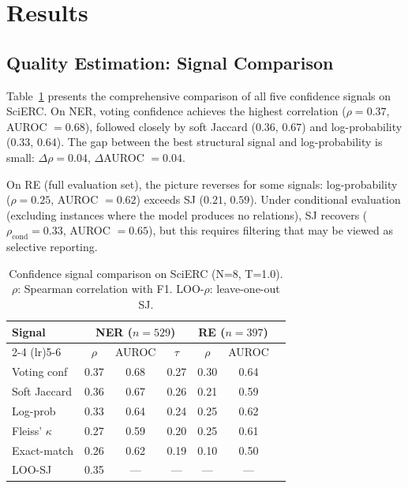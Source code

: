 \documentclass[11pt,a4paper]{article}
\begin{document}
\section{Results}
\label{sec:results}

\subsection{Quality Estimation: Signal Comparison}
\label{sec:quality}

Table~\ref{tab:signal_comparison} presents the comprehensive comparison of all five confidence signals on SciERC. On NER, voting confidence achieves the highest correlation ($\rho = 0.37$, AUROC $= 0.68$), followed closely by soft Jaccard ($0.36$, $0.67$) and log-probability ($0.33$, $0.64$). The gap between the best structural signal and log-probability is small: $\Delta\rho = 0.04$, $\Delta$AUROC $= 0.04$.

On RE (full evaluation set), the picture reverses for some signals: log-probability ($\rho = 0.25$, AUROC $= 0.62$) exceeds SJ ($0.21$, $0.59$). Under conditional evaluation (excluding instances where the model produces no relations), SJ recovers ($\rho_{\text{cond}} = 0.33$, AUROC $= 0.65$), but this requires filtering that may be viewed as selective reporting.

\begin{table}[t]
\centering
\small
\caption{Confidence signal comparison on SciERC (N=8, T=1.0). $\rho$: Spearman correlation with F1. LOO-$\rho$: leave-one-out SJ.}
\label{tab:signal_comparison}
\begin{tabular}{lcccccc}
\toprule
Signal & \multicolumn{3}{c}{NER ($n=529$)} & \multicolumn{2}{c}{RE ($n=397$)} \\
\cmidrule(lr){2-4} \cmidrule(lr){5-6}
 & $\rho$ & AUROC & $\tau$ & $\rho$ & AUROC \\
\midrule
Voting conf & 0.37 & 0.68 & 0.27 & 0.30 & 0.64 \\
Soft Jaccard & 0.36 & 0.67 & 0.26 & 0.21 & 0.59 \\
Log-prob & 0.33 & 0.64 & 0.24 & 0.25 & 0.62 \\
Fleiss' $\kappa$ & 0.27 & 0.59 & 0.20 & 0.25 & 0.61 \\
Exact-match & 0.26 & 0.62 & 0.19 & 0.10 & 0.50 \\
\midrule
LOO-SJ & 0.35 & --- & --- & --- & --- \\
\bottomrule
\end{tabular}
\end{table}
\end{document}
